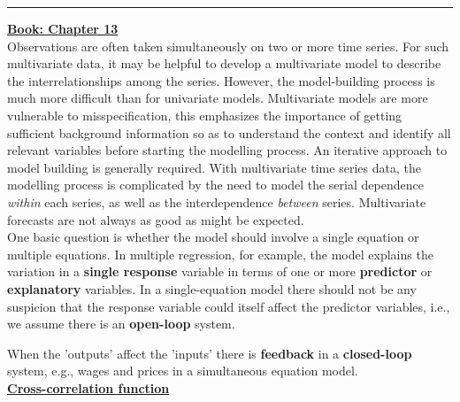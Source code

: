 \rule{\textwidth}{0.4pt}
\bigskip
\textbf{\underline{Book: Chapter 13}}\\

Observations are often taken simultaneously on two or more time series. For such multivariate data, it may be helpful to develop a multivariate model to describe the interrelationships among the series. However, the model-building process is much more difficult than for univariate models. Multivariate models are more vulnerable to misspecification, this emphasizes the importance of getting sufficient background information so as to understand the context and identify all relevant variables before starting the modelling process. An iterative approach to model building is generally required. With multivariate time series data, the modelling process is complicated by the need to model the serial dependence \textit{within} each series, as well as the interdependence \textit{between} series. Multivariate forecasts are not always as good as might be expected.\\

One basic question is whether the model should involve a single equation or multiple equations. In multiple regression, for example, the model explains the variation in a \textbf{single response} variable in terms of one or more \textbf{predictor} or \textbf{explanatory} variables. In a single-equation model there should not be any suspicion that the response variable could itself affect the predictor variables, i.e., we assume there is an \textbf{open-loop} system. \

When the 'outputs' affect the 'inputs' there is \textbf{feedback} in a \textbf{closed-loop} system, e.g., wages and prices in a simultaneous equation model. \\

\bigskip
\noindent
\textbf{\underline{Cross-correlation function}}\\

